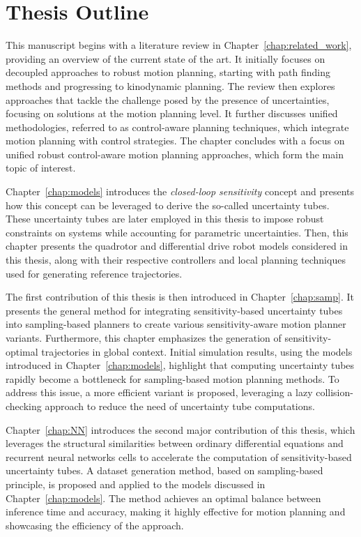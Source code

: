 \section{Thesis Outline}

This manuscript begins with a literature review in Chapter~\ref{chap:related_work}, providing an overview of the current state of the art. 
It initially focuses on decoupled approaches to robust motion planning, starting with path finding methods and progressing to kinodynamic planning.
The review then explores approaches that tackle the challenge posed by the presence of uncertainties, focusing on solutions at the motion planning level. 
It further discusses unified methodologies, referred to as control-aware planning techniques, which integrate motion planning with control strategies.
The chapter concludes with a focus on unified robust control-aware motion planning approaches, which form the main topic of interest.

Chapter~\ref{chap:models} introduces the \emph{closed-loop sensitivity} concept and presents how this concept can be leveraged to derive the so-called uncertainty tubes.
These uncertainty tubes are later employed in this thesis to impose robust constraints on systems while accounting for parametric uncertainties.
Then, this chapter presents the quadrotor and differential drive robot models considered in this thesis, along with their respective controllers and local planning techniques used for generating reference trajectories.

The first contribution of this thesis is then introduced in Chapter~\ref{chap:samp}.
It presents the general method for integrating sensitivity-based uncertainty tubes into sampling-based planners to create various sensitivity-aware motion planner variants.
Furthermore, this chapter emphasizes the generation of sensitivity-optimal trajectories in global context.
Initial simulation results, using the models introduced in Chapter~\ref{chap:models}, highlight that computing uncertainty tubes rapidly become a bottleneck for sampling-based motion planning methods.
To address this issue, a more efficient variant is proposed, leveraging a lazy collision-checking approach to reduce the need of uncertainty tube computations.

Chapter~\ref{chap:NN} introduces the second major contribution of this thesis, which leverages the structural similarities between ordinary differential equations and recurrent neural networks cells to accelerate the computation of sensitivity-based uncertainty tubes. 
A dataset generation method, based on sampling-based principle, is proposed and applied to the models discussed in Chapter~\ref{chap:models}. 
The method achieves an optimal balance between inference time and accuracy, making it highly effective for motion planning and showcasing the efficiency of the approach.

